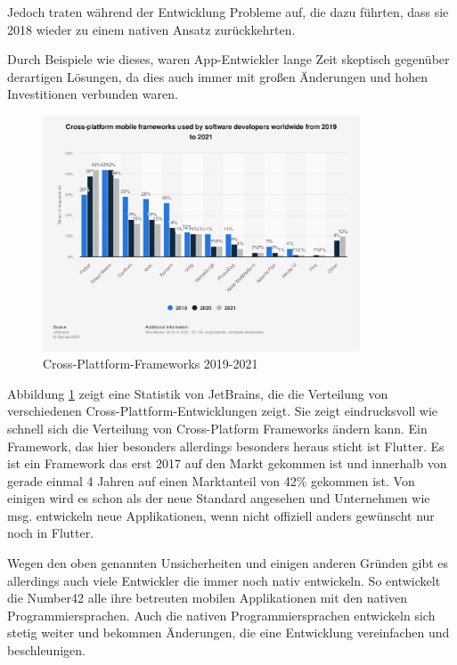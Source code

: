 Jedoch traten während der Entwicklung Probleme auf, die dazu führten, dass sie 2018 wieder zu einem nativen Ansatz zurückkehrten.

Durch Beispiele wie dieses, waren App-Entwickler lange Zeit skeptisch gegenüber derartigen Lösungen, da dies auch immer mit großen Änderungen und hohen Investitionen verbunden waren.

\begin{figure}[ht]
  \centering
  \includegraphics[height=7cm,keepaspectratio]{images/cross-platform-mobile-frameworks.png} 
  \caption[Statistik Cross-Plattform-Frameworks]{Cross-Plattform-Frameworks 2019-2021 \cite{statist_CP_Framework}}
  \label{fig:statista_cross_plattform}
\end{figure}
Abbildung \ref{fig:statista_cross_plattform} zeigt eine Statistik von JetBrains, die die Verteilung von verschiedenen Cross-Plattform-Entwicklungen zeigt. Sie zeigt eindrucksvoll wie schnell sich die Verteilung von Cross-Platform Frameworks ändern kann.
Ein Framework, das hier besonders allerdings besonders heraus sticht ist Flutter. Es ist ein Framework das erst 2017 auf den Markt gekommen ist und innerhalb von gerade einmal 4 Jahren auf einen Marktanteil von 42\% gekommen ist. Von einigen wird es schon als der neue Standard angesehen und Unternehmen wie msg. entwickeln neue Applikationen, wenn nicht offiziell anders gewünscht nur noch in Flutter.

Wegen den oben genannten Unsicherheiten und einigen anderen Gründen gibt es allerdings auch viele Entwickler die immer noch nativ entwickeln. So entwickelt die Number42 alle ihre betreuten mobilen Applikationen mit den nativen Programmiersprachen. Auch die nativen Programmiersprachen entwickeln sich stetig weiter und bekommen Änderungen, die eine Entwicklung vereinfachen und beschleunigen.



